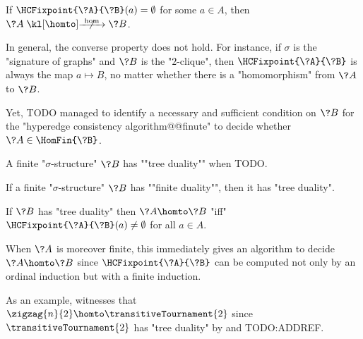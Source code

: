 \begin{corollary}
	\AP\label{coro:HC-empty-implies-no-hom}
	If $\HCFixpoint{\?A}{\?B}(a) = \emptyset$ for some $a\in A$, then
	$\?A \nothomto \?B$.
\end{corollary}

In general, the converse property does not hold. For instance, if $\sigma$ is the
"signature of graphs" and $\?B$ is the "$2$-clique", then $\HCFixpoint{\?A}{\?B}$
is always the map $a \mapsto B$, no matter whether there is a "homomorphism" from
$\?A$ to $\?B$.

Yet, TODO managed to identify a necessary and sufficient condition on $\?B$ for
the "hyperedge consistency algorithm@@finute" to decide whether $\?A \in \HomFin{\?B}$.
\begin{definition}
	\AP\label{defn:tree-duality}
	A finite "$\sigma$-structure" $\?B$ has ""tree duality"" when TODO.
\end{definition}

\begin{proposition}
	\AP\label{prop:finite-duality-implies-tree-duality}
	If a finite "$\sigma$-structure" $\?B$ has ""finite duality"",
	then it has "tree duality".
\end{proposition}

\begin{proposition}
	\AP\label{prop:hyperedge-consistency-tree-duality}
	If $\?B$ has "tree duality" then $\?A \homto \?B$ "iff"
	$\HCFixpoint{\?A}{\?B}(a) \neq \emptyset$ for all $a\in A$.
\end{proposition}

When $\?A$ is moreover finite, this immediately gives an algorithm to decide
$\?A \homto \?B$ since $\HCFixpoint{\?A}{\?B}$ can be computed not only
by an ordinal induction but with a finite induction.

As an example,  witnesses that
$\zigzag{n}{2} \homto \transitiveTournament{2}$ since $\transitiveTournament{2}$
has "tree duality" by  and TODO:ADDREF.

